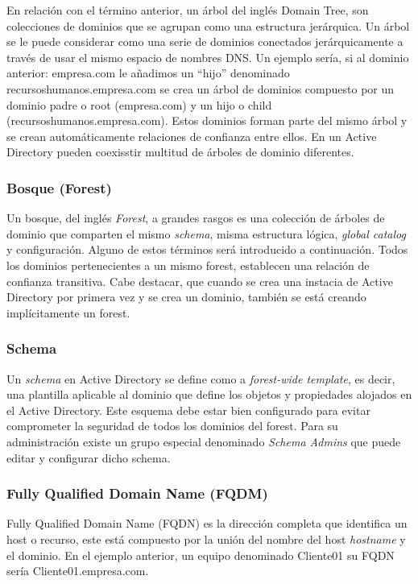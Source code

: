 En relación con el término anterior, un árbol del inglés {Domain Tree}, son colecciones de dominios que se agrupan como una estructura jerárquica. Un árbol se le puede considerar como una serie de dominios conectados jerárquicamente a través de usar el mismo espacio de nombres DNS. Un ejemplo sería, si al dominio anterior: empresa.com le añadimos un ``hijo'' denominado recursoshumanos.empresa.com se crea un árbol de dominios compuesto por un dominio padre o root (empresa.com) y un hijo o child (recursoshumanos.empresa.com). Estos dominios forman parte del mismo árbol y se crean automáticamente relaciones de confianza entre ellos. En un Active Directory pueden coexisstir multitud de árboles de dominio diferentes. 

\subsubsection{Bosque (Forest)}
Un bosque, del inglés {\it Forest}, a grandes rasgos es una colección de árboles de dominio que comparten el mismo {\it schema}, misma estructura lógica, {\it global catalog} y configuración. Alguno de estos términos será introducido a continuación. Todos los dominios pertenecientes a un mismo forest, establecen una relación de confianza transitiva. Cabe destacar, que cuando se crea una instacia de Active Directory por primera vez y se crea un dominio, también se está creando implícitamente un forest. 

\subsubsection{Schema}

Un {\it schema} en Active Directory se define como a {\it forest-wide template}, es decir, una plantilla aplicable al dominio que define los objetos y propiedades alojados en el Active Directory. Este esquema debe estar bien configurado para evitar comprometer la seguridad de todos los dominios del forest. Para su administración existe un grupo especial denominado {\it Schema Admins} que puede editar y configurar dicho schema. 

\subsubsection{Fully Qualified Domain Name (FQDM)}

Fully Qualified Domain Name (FQDN) es la dirección completa que identifica un host o recurso, este está compuesto por la unión del nombre del host {\it hostname} y el dominio. En el ejemplo anterior, un equipo denominado Cliente01 su FQDN sería Cliente01.empresa.com. 

